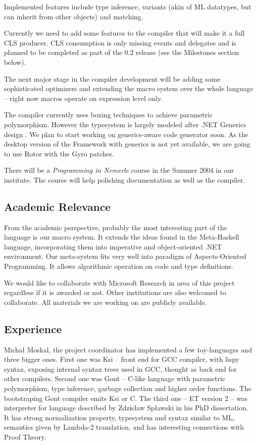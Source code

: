 \documentclass[a4paper,11pt]{article}
\begin{document}
Implemented features include type inference, variants (akin of ML
datatypes, but can inherit from other objects) and matching.

Currently we need to add some features to the compiler that will make
it a full CLS producer. CLS consumption is only missing events and
delegates and is planned to be completed as part of the 0.2 release
(see the Milestones section below).

The next major stage in the compiler development will be adding some
sophisticated optimizers and extending the macro system over the whole
language -- right now macros operate on expression level only.

The compiler currently uses boxing techniques to achieve parametric
polymorphism.  However the typesystem is largely modeled after .NET
Generics design \cite{generics}. We plan to start working on 
generics-aware code generator soon. As the desktop version of 
the Framework with generics is not yet available, we are going
to use Rotor with the Gyro patches.

There will be a \textit{Programming in Nemerle} course in the Summer
2004 in our institute.  The course will help polishing documentation as
well as the compiler.


\subsection{Academic Relevance}

From the academic perspective, probably the most interesting part of
the language is our macro system. It extends the ideas found in the
Meta-Haskell \cite{MetaHaskell} language, incorporating them into
imperative and object-oriented .NET environment. Our meta-system fits
very well into paradigm of Aspects-Oriented Programming. It allows
algorithmic operation on code and type definitions.

We would like to collaborate with Microsoft Research in area of this
project regardless if it is awarded or not. Other institutions are also
welcomed to collaborate. All materials we are working on are publicly
available.



\subsection{Experience}

Micha{\l} Moskal, the project coordinator has implemented a few
toy-languages and three bigger ones. First one was Ksi -- front end for
GCC compiler, with lispy syntax, exposing internal syntax trees used in
GCC, thought as back end for other compilers.  Second one was Gont --
C-like language with parametric polymorphism, type inference, garbage
collection and higher order functions. The bootstraping Gont compiler
emits Ksi or C. The third one -- ET version 2 -- was interpreter for
language described by Zdzis{\l}aw Sp{\l}awski in his PhD dissertation.
It has strong normalization property, typesystem and syntax similar to ML,
semantics given by Lambda-2 translation, and has interesting connections
with Proof Theory.
\end{document}
